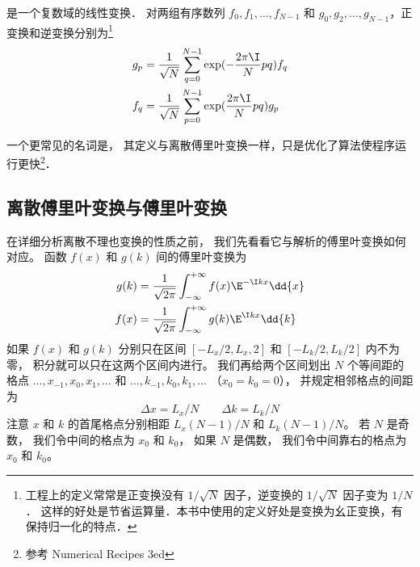 
是一个复数域的线性变换． 对两组有序数列 $f_0, f_1, \dots, f_{N-1}$ 和 $g_0,g_2,\dots, g_{N-1}$，正变换和逆变换分别为\footnote{工程上的定义常常是正变换没有 $1/\sqrt{N}$ 因子，逆变换的 $1/\sqrt{N}$ 因子变为 $1/N$． 这样的好处是节省运算量．本书中使用的定义好处是变换为幺正变换，有保持归一化的特点．}
\begin{align}
g_p &= \frac{1}{\sqrt{N}}\sum_{q=0}^{N-1} \exp(-\frac{2\pi\I}{N} p q ) f_q \\
f_q &= \frac{1}{\sqrt{N}}\sum_{p=0}^{N-1} \exp(\frac{2\pi\I}{N} p q) g_p
\end{align}

一个更常见的名词是， 其定义与离散傅里叶变换一样，只是优化了算法使程序运行更快\footnote{参考 Numerical Recipes 3ed}．

\subsection{离散傅里叶变换与傅里叶变换}
在详细分析离散不理也变换的性质之前， 我们先看看它与解析的傅里叶变换如何对应。 函数 $f(x)$ 和 $g(k)$ 间的傅里叶变换为
\begin{align}
g(k) &= \frac{1}{\sqrt{2\pi}} \int_{-\infty}^{+\infty} f(x)\E^{-\I kx} \dd{x}\label{DFT_eq3}\\
f(x) &= \frac{1}{\sqrt{2\pi}} \int_{-\infty}^{+\infty} g(k)\E^{\I kx} \dd{k}\label{DFT_eq4}
\end{align}
如果 $f(x)$ 和 $g(k)$ 分别只在区间 $[-L_x/2, L_x, 2]$ 和 $[-L_k/2, L_k/2]$ 内不为零， 积分就可以只在这两个区间内进行。 我们再给两个区间划出 $N$ 个等间距的格点 $\dots, x_{-1}, x_0, x_1,\dots$ 和 $\dots, k_{-1}, k_0, k_1,\dots$ （$x_0 = k_0 = 0$）， 并规定相邻格点的间距为
\begin{equation}
\Delta x = L_x/N \qquad \Delta k = L_k/N
\end{equation}
注意 $x$ 和 $k$ 的首尾格点分别相距 $L_x(N-1)/N$ 和 $L_k(N-1)/N$。 若 $N$ 是奇数， 我们令中间的格点为 $x_0$ 和 $k_0$， 如果 $N$ 是偶数， 我们令中间靠右的格点为 $x_0$ 和 $k_0$。

